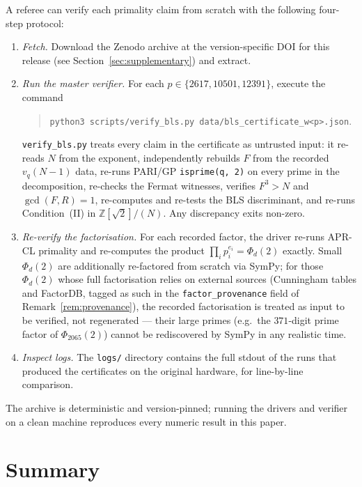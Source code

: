 \documentclass[11pt,a4paper]{amsart}
\theoremstyle{plain}
\theoremstyle{definition}
\newcommand{\Z}{\mathbb{Z}}
\newcommand{\sqrttwo}{\sqrt{2}}
\begin{document}
A referee can verify each primality claim from scratch with the
following four-step protocol:
\begin{enumerate}
\item \emph{Fetch.} Download the Zenodo archive at the version-specific
  DOI for this release (see Section~\ref{sec:supplementary}) and extract.
\item \emph{Run the master verifier.} For each $p \in \{2617, 10501,
  12391\}$, execute the command
  \begin{quote}
    \small
    \texttt{python3 scripts/verify\_bls.py
      data/bls\_certificate\_w<p>.json}.
  \end{quote}
  \texttt{verify\_bls.py} treats every claim in the certificate as
  untrusted input: it re-reads $N$ from the exponent, independently
  rebuilds $F$ from the recorded $v_q(N - 1)$ data, re-runs PARI/GP
  \texttt{isprime(q, 2)} on every prime in the decomposition, re-checks
  the Fermat witnesses, verifies $F^3 > N$ and $\gcd(F, R) = 1$,
  re-computes and re-tests the BLS discriminant, and re-runs
  Condition~(II) in $\Z[\sqrttwo]/(N)$. Any discrepancy exits non-zero.
\item \emph{Re-verify the factorisation.} For each recorded factor,
  the driver re-runs APR-CL primality and re-computes the product
  $\prod_i p_i^{e_i} = \Phi_d(2)$ exactly. Small $\Phi_d(2)$ are
  additionally re-factored from scratch via SymPy; for those
  $\Phi_d(2)$ whose full factorisation relies on external sources
  (Cunningham tables and FactorDB, tagged as such in the
  \texttt{factor\_provenance} field of Remark~\ref{rem:provenance}),
  the recorded factorisation is treated as input to be verified, not
  regenerated --- their large primes (e.g.\ the $371$-digit prime
  factor of $\Phi_{2065}(2)$) cannot be rediscovered by SymPy in any
  realistic time.
\item \emph{Inspect logs.} The \texttt{logs/} directory contains the
  full stdout of the runs that produced the certificates on the
  original hardware, for line-by-line comparison.
\end{enumerate}

The archive is deterministic and version-pinned; running the drivers
and verifier on a clean machine reproduces every numeric result in
this paper.

\section{Summary}
\label{sec:outlook}
\end{document}
